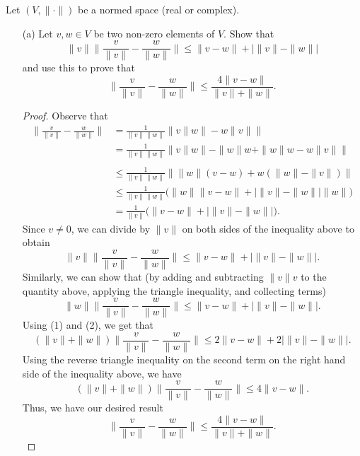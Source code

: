 \documentclass[a4paper]{article}
\begin{document}
\begin{problem}
    Let \( (V, \|\cdot\|) \) be a normed space (real or complex).
\end{problem}
\begin{enumerate}
    \item[(a)] Let \(  v,w \in V  \) be two non-zero elements of \( V  \). Show that 
        \[  \|v\| \Big\| \frac{ v }{ \|v\|  }  - \frac{ w  }{  \|w\| }  \Big\|  \leq \|v - w \| + \Big| \|v\| - \|w\| \Big|  \] 
        and use this to prove that 
        \[  \Big\| \frac{ v }{  \|v \| }  - \frac{ w }{ \|w\| }  \Big\| \leq \frac{ 4 \|v - w \| }{  \|v \| + \|w \| }. \]
        \begin{proof}
        Observe that 
        \begin{align*}
            \Big\| \frac{ v  }{  \|v \| }  - \frac{ w }{ \|w\| }  \Big\| &= \frac{ 1 }{ \|v\| \|w\| }  \|v \|w\| - w \| v \| \| \\
                                                                         &= \frac{ 1 }{ \|v\| \|w\| }  \|v \|w \| - \|w \| w + \|w \| w - w \|v \| \| \\ \\
                                                                         &\leq \frac{ 1 }{ \|v\| \|w \| }  \| \|w\| (v -w) + w (\|w\| - \|v\|) \| \\
                                                                         &\leq \frac{ 1 }{ \|v\| \|w\| } \Big( \|w\|\| v - w \| +  \Big| \|v\| - \|w\| \Big|   \|w\|  \Big) \\
                                                                         &= \frac{ 1 }{ \|v\| } \Big(\|v - w\| + \Big| \|v\| - \|w\| \Big|  \Big).
        \end{align*}
        Since \( v \neq 0  \), we can divide by \( \|v\| \) on both sides of the inequality above to obtain
        \[  \|v\| \Big\| \frac{  v  }{ \|v \| }  - \frac{ w }{ \|w\| }  \Big\|  \leq \|v - w \| + \Big| \|v\| - \|w\| \Big|. \tag{1}\]
        Similarly, we can show that (by adding and subtracting \( \|v\|v  \) to the quantity above, applying the triangle inequality, and collecting terms)
        \[  \|w\| \Big\| \frac{ v  }{  \|v \|  }  - \frac{ w }{  \|w\| } \Big\|\leq \|v - w \| + \Big| \|v\| - \|w\| \Big|. \tag{2}  \]
       Using (1) and (2), we get that  
       \[  (\|v\| + \|w\|) \Big\| \frac{  v  }{  \|v \|   }  - \frac{ w }{ \|w\| }\Big\| \leq 2 \|v - w \| + 2 \Big|  \|v \| - \|w \| \Big|.  \]
       Using the reverse triangle inequality on the second term on the right hand side of the inequality above, we have 
       \[  (\|v\| + \|w\|) \Big\| \frac{ v }{  \|v\| }  - \frac{ w }{ \|w\| } \Big\| \leq 4 \|v - w \|. \]
       Thus, we have our desired result
       \[   \Big\| \frac{ v }{  \|v\| }  - \frac{ w }{ \|w\| } \Big\| \leq \frac{ 4 \|v - w \|}{\|v\| + \|w\|} . \]


\end{proof}
\end{enumerate}
\end{document}

